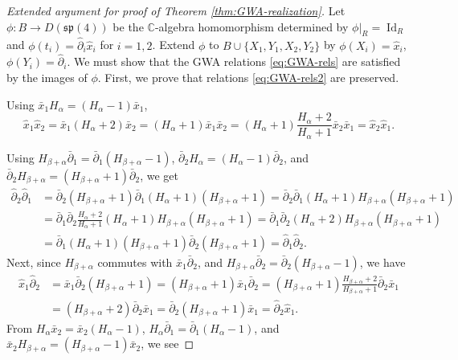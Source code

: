 \documentclass[10pt,a4paper]{article}
\numberwithin{equation}{section}
\DeclareMathOperator{\Id}{Id}
\begin{document}
\begin{proof}[Extended argument for proof of Theorem \ref{thm:GWA-realization}]
	Let $\phi\colon B\to D(\mathfrak{sp}(4))$ be the $\mathbb{C}$-algebra homomorphism determined by $\phi|_R=\Id_R$ and $\phi(t_i)=\hat\partial_i\hat x_i$ for $i=1,2$. Extend $\phi$ to $B\cup\{X_1,Y_1,X_2,Y_2\}$ by $\phi(X_i)=\hat x_i$, $\phi(Y_i)=\hat\partial_i$. We must show that the GWA relations \eqref{eq:GWA-rels} are satisfied by the images of $\phi$.
	First, we prove that relations \eqref{eq:GWA-rels2} are preserved.
	
	Using $\bar{x}_1 H_\alpha = (H_\alpha-1)\bar{x}_1$,
	\[
	\hat{x}_1\hat{x}_2 = \bar{x}_1(H_\alpha+2)\bar{x}_2 = (H_\alpha+1)\bar{x}_1\bar{x}_2=(H_\alpha+1)\frac{H_\alpha+2}{H_\alpha+1}\bar{x}_2\bar{x}_1=\hat{x}_2\hat{x}_1.
	\]
	
	Using $H_{\beta+\alpha}\bar{\partial}_1=\bar{\partial}_1(H_{\beta+\alpha}-1)$, $\bar{\partial}_2 H_\alpha=(H_\alpha-1)\bar{\partial}_2$, and $\bar{\partial}_2 H_{\beta+\alpha} = (H_{\beta+\alpha}+1)\bar{\partial}_2$, we get
	\begin{align*}
		\hat{\partial}_2\hat{\partial}_1 &= \bar{\partial}_2(H_{\beta+\alpha}+1)\bar{\partial}_1(H_\alpha+1)(H_{\beta+\alpha}+1)=\bar{\partial}_2\bar{\partial}_1(H_\alpha+1)H_{\beta+\alpha}(H_{\beta+\alpha}+1)\\
		&=\bar{\partial}_1\bar{\partial}_2\frac{H_\alpha+2}{H_\alpha+1}(H_\alpha+1)H_{\beta+\alpha}(H_{\beta+\alpha}+1)=
		\bar{\partial}_1\bar{\partial}_2(H_\alpha+2)H_{\beta+\alpha}(H_{\beta+\alpha}+1)\\
		&=\bar{\partial}_1 (H_\alpha+1)(H_{\beta+\alpha}+1)\bar{\partial}_2(H_{\beta+\alpha}+1)=\hat{\partial}_1\hat{\partial}_2.
	\end{align*}
	Next, since $H_{\beta+\alpha}$ commutes with $\bar{x}_1\bar{\partial}_2$, and $H_{\beta+\alpha}\bar{\partial}_2=\bar{\partial}_2(H_{\beta+\alpha}-1)$, we have
	\begin{align*}
		\hat{x}_1\hat{\partial}_2 &= \bar{x}_1\bar{\partial}_2(H_{\beta+\alpha}+1)=
		(H_{\beta+\alpha}+1)\bar{x}_1\bar{\partial}_2=
		(H_{\beta+\alpha}+1)\frac{H_{\beta+\alpha}+2}{H_{\beta+\alpha}+1}\bar{\partial}_2\bar{x}_1\\
		&=(H_{\beta+\alpha}+2)\bar{\partial}_2\bar{x}_1=\bar{\partial}_2(H_{\beta+\alpha}+1)\bar{x}_1=\hat{\partial}_2\hat{x}_1.
	\end{align*}
	From $H_\alpha\bar{x}_2=\bar{x}_2(H_\alpha-1)$, $H_\alpha\bar{\partial}_1=\bar{\partial}_1(H_\alpha-1)$, and $\bar{x}_2 H_{\beta+\alpha} = (H_{\beta+\alpha}-1)\bar{x}_2$, we see

\end{proof}
\end{document}

